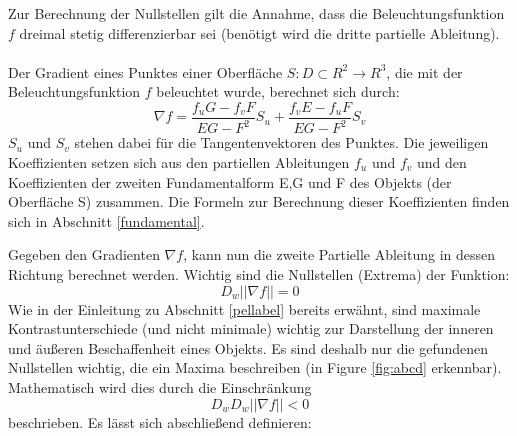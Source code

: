 \documentclass{paperStyle}
\begin{document}
Zur Berechnung der Nullstellen gilt die Annahme, dass die Beleuchtungsfunktion $f$ dreimal stetig differenzierbar sei (benötigt wird die dritte partielle Ableitung). \\\\
Der Gradient eines Punktes einer Oberfläche $S : D \subset R^{2} \longrightarrow R^{3}$, die mit der Beleuchtungsfunktion $f$ beleuchtet wurde, berechnet sich durch:
\begin{equation}
\nabla f = \frac{ f_{ u }G - f_{ v }F }{EG - F^{ 2 }  }S_{ u } + \frac{ f_{ v }E - f_{ u }F }{EG - F^{ 2 } } S_{ v }  
	\label{eq:gradientf}
\end{equation}
$S_{ u } $ und $S_{ v }$ stehen dabei für die Tangentenvektoren des Punktes. Die jeweiligen Koeffizienten setzen sich aus den partiellen Ableitungen $f_{ u }$ und $f_{ v }$ und den Koeffizienten der zweiten Fundamentalform E,G und F des Objekts (der Oberfläche S) zusammen. Die Formeln zur Berechnung dieser Koeffizienten finden sich in Abschnitt \ref{fundamental}.

Gegeben den Gradienten $\nabla f$, kann nun die zweite Partielle Ableitung in dessen Richtung berechnet werden. Wichtig sind die Nullstellen (Extrema) der Funktion:
\begin{equation}
D_{w}||\nabla f || = 0
	\label{eq:dw}
\end{equation}
Wie in der Einleitung zu Abschnitt \ref{pellabel} bereits erwähnt, sind maximale Kontrastunterschiede (und nicht minimale) wichtig zur Darstellung der inneren und äußeren Beschaffenheit eines Objekts. Es sind deshalb nur die gefundenen Nullstellen wichtig, die ein Maxima beschreiben (in Figure \ref{fig:abcd} erkennbar). Mathematisch wird dies durch die Einschränkung
\begin{equation}
D_{w}D_{w}||\nabla f || < 0	
\label{eq:dwdw}
\end{equation}
beschrieben. Es lässt sich abschließend definieren:
\end{document}
